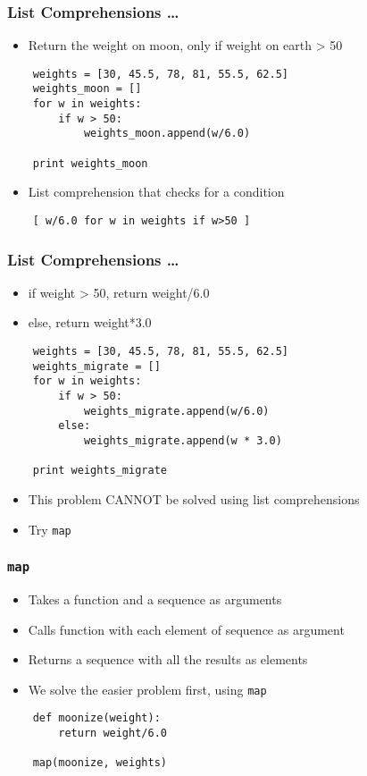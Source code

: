 \begin{frame}[fragile]
  \frametitle{List Comprehensions \ldots}
  \begin{itemize}
  \item Return the weight on moon, only if weight on earth > 50
  \end{itemize}
  \begin{lstlisting}
    weights = [30, 45.5, 78, 81, 55.5, 62.5]
    weights_moon = []
    for w in weights:
        if w > 50:
            weights_moon.append(w/6.0)

    print weights_moon
  \end{lstlisting}
  \begin{itemize}
  \item List comprehension that checks for a condition
  \end{itemize}
  \begin{lstlisting}
    [ w/6.0 for w in weights if w>50 ]
  \end{lstlisting}
\end{frame}

\begin{frame}[fragile]
  \frametitle{List Comprehensions \ldots}
  \begin{itemize}
  \item if weight > 50, return weight/6.0
  \item else, return weight*3.0
  \end{itemize}
  \begin{lstlisting}
    weights = [30, 45.5, 78, 81, 55.5, 62.5]
    weights_migrate = []
    for w in weights:
        if w > 50:
            weights_migrate.append(w/6.0)
        else:
            weights_migrate.append(w * 3.0)

    print weights_migrate
  \end{lstlisting}
  \begin{itemize}
  \item This problem \alert{CANNOT} be solved using list
    comprehensions
  \item Try \texttt{map}
  \end{itemize}
\end{frame}

\begin{frame}[fragile]
  \frametitle{\texttt{map}}
  \begin{itemize}
  \item Takes a function and a sequence as arguments
  \item Calls function with each element of sequence as argument
  \item Returns a sequence with all the results as elements
  \item We solve the easier problem first, using \texttt{map}
  \end{itemize}

  \begin{lstlisting}
    def moonize(weight):
        return weight/6.0

    map(moonize, weights)
  \end{lstlisting}
\end{frame}

